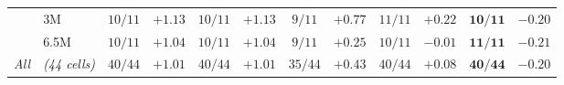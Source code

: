\begin{table}[h]
{\begin{tabular}{ll|cc|cc|cc|cc|cc}
 & 3M & $10/11$ & $+1.13$ & $10/11$ & $+1.13$ & $9/11$ & $+0.77$ & $11/11$ & $+0.22$ & $\mathbf{10/11}$ & $\mathbf{-0.20}$ \\
 & 6.5M & $10/11$ & $+1.04$ & $10/11$ & $+1.04$ & $9/11$ & $+0.25$ & $10/11$ & $-0.01$ & $\mathbf{11/11}$ & $\mathbf{-0.21}$ \\
\textit{All} & \textit{(44 cells)} & \textit{$40/44$} & \textit{$+1.01$} & \textit{$40/44$} & \textit{$+1.01$} & \textit{$35/44$} & \textit{$+0.43$} & \textit{$40/44$} & \textit{$+0.08$} & $\mathbf{40/44}$ & $\mathbf{-0.20}$ \\
\bottomrule
\end{tabular}
}
\end{table}
